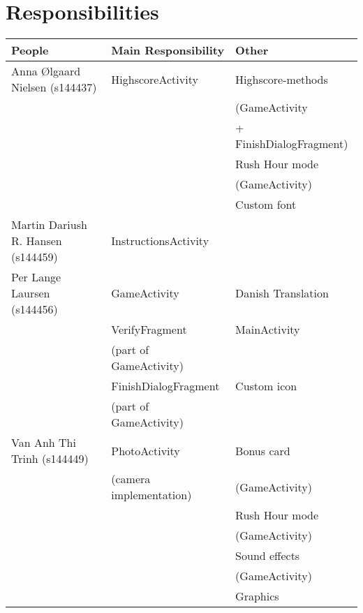 \section{Responsibilities}
\begin{table}[H]
	\begin{longtable}{|l|l|l|}
		\hline
		People & Main Responsibility & Other \\ \hline
		Anna Ølgaard Nielsen (s144437) & HighscoreActivity & Highscore-methods \\
		& & (GameActivity  \\
		& & + FinishDialogFragment) \\
		& & Rush Hour mode \\
		& & (GameActivity) \\
		& & Custom font \\ \hline
		Martin Dariush R. Hansen (s144459) & InstructionsActivity & \\ \hline
		Per Lange Laursen (s144456) & GameActivity & Danish Translation \\ 
		& VerifyFragment & MainActivity \\
		& (part of GameActivity) &  \\
		& FinishDialogFragment & Custom icon \\ 
		& (part of GameActivity) &  \\ \hline
		Van Anh Thi Trinh (s144449) & PhotoActivity & Bonus card \\ 
		& (camera implementation) & (GameActivity) \\
		& & Rush Hour mode \\ 
		& & (GameActivity) \\ 
		& & Sound effects  \\
		& & (GameActivity) \\
		& & Graphics \\ \hline
	\end{longtable}
\end{table}